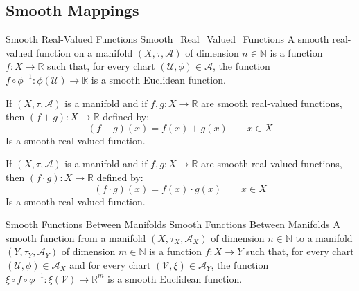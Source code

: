     \subsection{Smooth Mappings}
        \begin{fdefinition}{Smooth Real-Valued Functions}
                           {Smooth_Real_Valued_Functions}
            A smooth real-valued function on a manifold
            $(X,\tau,\mathcal{A})$ of dimension $n\in\mathbb{N}$ is a
            function $f:X\rightarrow\mathbb{R}$ such that, for every chart
            $(\mathcal{U},\phi)\in\mathcal{A}$, the function
            $f\circ\phi^{\minus{1}}:\phi(\mathcal{U})\rightarrow\mathbb{R}$
            is a smooth Euclidean function.
        \end{fdefinition}
        \begin{theorem}
            If $(X,\tau,\mathcal{A})$ is a manifold and if
            $f,g:X\rightarrow\mathbb{R}$ are smooth real-valued functions,
            then $(f+g):X\rightarrow\mathbb{R}$ defined by:
            \begin{equation}
                (f+g)(x)=f(x)+g(x)
                \quad\quad
                x\in{X}
            \end{equation}
            Is a smooth real-valued function.
        \end{theorem}
        \begin{theorem}
            If $(X,\tau,\mathcal{A})$ is a manifold and if
            $f,g:X\rightarrow\mathbb{R}$ are smooth real-valued functions,
            then $(f\cdot{g}):X\rightarrow\mathbb{R}$ defined by:
            \begin{equation}
                (f\cdot{g})(x)=f(x)\cdot{g}(x)
                \quad\quad
                x\in{X}
            \end{equation}
            Is a smooth real-valued function.
        \end{theorem}
        \begin{fdefinition}{Smooth Functions Between Manifolds}
                           {Smooth Functions Between Manifolds}
            A smooth function from a manifold $(X,\tau_{X},\mathcal{A}_{X})$
            of dimension $n\in\mathbb{N}$ to a manifold
            $(Y,\tau_{Y},\mathcal{A}_{Y})$ of dimension $m\in\mathbb{N}$ is
            a function $f:X\rightarrow{Y}$ such that, for every chart
            $(\mathcal{U},\phi)\in\mathcal{A}_{X}$ and for every chart
            $(\mathcal{V},\xi)\in\mathcal{A}_{Y}$, the function
            $\xi\circ{f}\circ\phi^{\minus{1}}:\xi(\mathcal{V})%
             \rightarrow\mathbb{R}^{m}$ is a smooth Euclidean function.
        \end{fdefinition}
